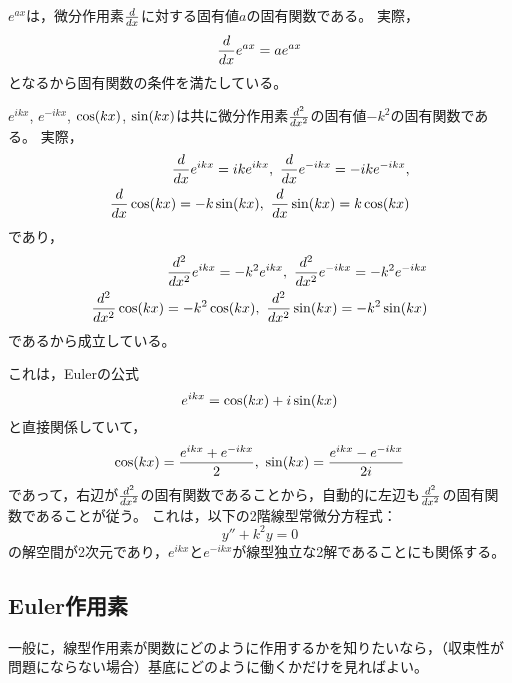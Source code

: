 \documentclass[a4paper,draft]{ltjsarticle}
\begin{document}
\begin{eg}
    $e^{ax}$は，微分作用素$\frac{d }{d x}$に対する固有値$a$の固有関数である。
    実際，
    \begin{equation}
        \frac{d }{d x}e^{ax}=ae^{ax}
    \end{equation}
    となるから固有関数の条件を満たしている。
\end{eg}

\begin{eg}
    $e^{ikx}$, $e^{-ikx}$, $\fun{\cos}{kx}$, $\fun{\sin}{kx}$は共に微分作用素$\frac{d^{2} }{d x^{2}}$の固有値$-k^2$の固有関数である。
    実際，
    \begin{align}
        \diff{}{x}e^{ikx}=ik e^{ikx},\
        \diff{}{x}e^{-ikx}=-ike^{-ikx},
        \\
        \diff{}{x}\fun{\cos}{kx}=-k\fun{\sin}{kx},\
        \diff{}{x}\fun{\sin}{kx}=k\fun{\cos}{kx}
    \end{align}
    であり，
    \begin{align}
        \diffn{}{x}{2}e^{ikx}=-k^2e^{ikx},\
        \diffn{}{x}{2}e^{-ikx}=-k^2e^{-ikx}
        \\
        \diffn{}{x}{2}\fun{\cos}{kx}=-k^2\fun{\cos}{kx},\
        \diffn{}{x}{2}\fun{\sin}{kx}=-k^2\fun{\sin}{kx}
    \end{align}
    であるから成立している。
    
    これは，Eulerの公式
    \begin{equation}
        e^{ikx}=\fun{\cos}{kx}+i\fun{\sin}{kx}
    \end{equation}
    と直接関係していて，
    \begin{equation}
        \fun{\cos}{kx}=\frac{e^{ikx}+e^{-ikx}}{2},\
        \fun{\sin}{kx}=\frac{e^{ikx}-e^{-ikx}}{2i}
    \end{equation}
    であって，右辺が$\frac{d^{2} }{d x^{2}}$の固有関数であることから，自動的に左辺も$\frac{d^{2} }{d x^{2}}$の固有関数であることが従う。
    これは，以下の2階線型常微分方程式：
    \begin{equation}
        y''+k^2y=0
    \end{equation}
    の解空間が2次元であり，$e^{ikx}$と$e^{-ikx}$が線型独立な2解であることにも関係する。
\end{eg}


\subsection{Euler作用素}
一般に，線型作用素が関数にどのように作用するかを知りたいなら，（収束性が問題にならない場合）基底にどのように働くかだけを見ればよい。
\end{document}
